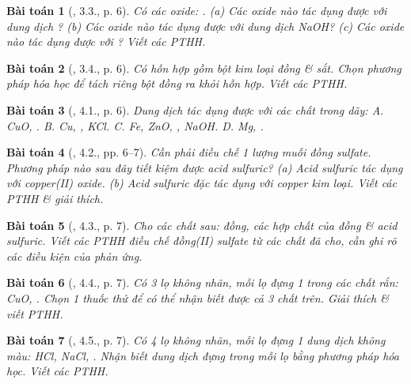 \documentclass{article}
\newtheorem{baitoan}{Bài toán}
\begin{document}
\begin{baitoan}[\cite{SBT_Hoa_Hoc_9}, 3.3., p. 6]
	Có các oxide: \emph{}. (a) Các oxide nào tác dụng được với dung dịch \emph{}? (b) Các oxide nào tác dụng được với dung dịch \emph{NaOH}? (c) Các oxide nào tác dụng được với \emph{}? Viết các PTHH.
\end{baitoan}

\begin{baitoan}[\cite{SBT_Hoa_Hoc_9}, 3.4., p. 6]
	Có hỗn hợp gồm bột kim loại đồng \& sắt. Chọn phương pháp hóa học để tách riêng bột đồng ra khỏi hỗn hợp. Viết các PTHH.
\end{baitoan}

\begin{baitoan}[\cite{SBT_Hoa_Hoc_9}, 4.1., p. 6]
	Dung dịch \emph{} tác dụng được với các chất trong dãy: {\sf A.} \emph{CuO, }. {\sf B.} \emph{Cu, , KCl}. {\sf C.} \emph{Fe, ZnO, , NaOH}. {\sf D.} \emph{Mg, }.
\end{baitoan}

\begin{baitoan}[\cite{SBT_Hoa_Hoc_9}, 4.2., pp. 6--7]
	Cần phải điều chế 1 lượng muối đồng sulfate. Phương pháp nào sau đây tiết kiệm được acid sulfuric? (a) Acid sulfuric tác dụng với copper(II) oxide. (b) Acid sulfuric đặc tác dụng với copper kim loại. Viết các PTHH \& giải thích.
\end{baitoan}

\begin{baitoan}[\cite{SBT_Hoa_Hoc_9}, 4.3., p. 7]
	Cho các chất sau: đồng, các hợp chất của đồng \& acid sulfuric. Viết các PTHH điều chế đồng(II) sulfate từ các chất đã cho, cần ghi rõ các điều kiện của phản ứng.
\end{baitoan}

\begin{baitoan}[\cite{SBT_Hoa_Hoc_9}, 4.4., p. 7]
	Có 3 lọ không nhãn, mỗi lọ đựng 1 trong các chất rắn: \emph{CuO, }. Chọn 1 thuốc thử để có thể nhận biết được cả 3 chất trên. Giải thích \& viết PTHH.
\end{baitoan}

\begin{baitoan}[\cite{SBT_Hoa_Hoc_9}, 4.5., p. 7]
	Có 4 lọ không nhãn, mỗi lọ đựng 1 dung dịch không màu: \emph{HCl, NaCl, }. Nhận biết dung dịch đựng trong mỗi lọ bằng phương pháp hóa học. Viết các PTHH.
\end{baitoan}
\end{document}
